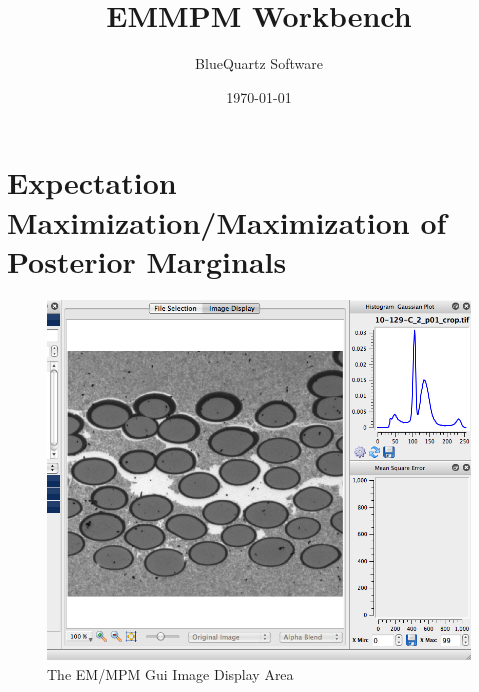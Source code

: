\documentclass[12pt,oneside]{book}
\title{EMMPM Workbench}
\author{BlueQuartz Software}
\date{\today}
\begin{document}
\maketitle
    


{}
\tableofcontents
{}
\hypersetup{pageanchor=true}


\chapter{Expectation Maximization/Maximization of Posterior Marginals}


\label{Expectation Maximization/Maximization of Posterior Marginals}
\hypertarget{Expectation Maximization/Maximization of Posterior Marginals}{}
\begin{figure}[htbp]
\begin{center}
\includegraphics[width=6.0in]{images/UserInterface_3.png}
\caption{The EM/MPM Gui Image Display Area}
\label{UserInterface_3}
\end{center}
\end{figure}
\end{document}
